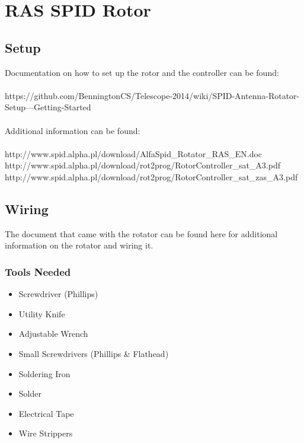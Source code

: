 \documentclass[11pt]{article} %
\begin{document}
\newpage
\section{RAS SPID Rotor}

\subsection{Setup}

Documentation on how to set up the rotor and the controller can be found: \\ \\
https://github.com/BenningtonCS/Telescope-2014/wiki/SPID-Antenna-Rotator-Setup---Getting-Started
\\ \\
Additional information can be found: \\ \\
http://www.spid.alpha.pl/download/AlfaSpid\_Rotator\_RAS\_EN.doc \\
http://www.spid.alpha.pl/download/rot2prog/RotorController\_sat\_A3.pdf \\
http://www.spid.alpha.pl/download/rot2prog/RotorController\_sat\_zas\_A3.pdf \\




\subsection{Wiring}


The document that came with the rotator can be found here for additional information on the rotator and wiring it.

\subsubsection{Tools Needed}
\begin{itemize}
\item Screwdriver (Phillips)
\item Utility Knife
\item Adjustable Wrench
\item Small Screwdrivers (Phillips \& Flathead)
\item Soldering Iron
\item Solder
\item Electrical Tape
\item Wire Strippers
\end{itemize}
\end{document}
